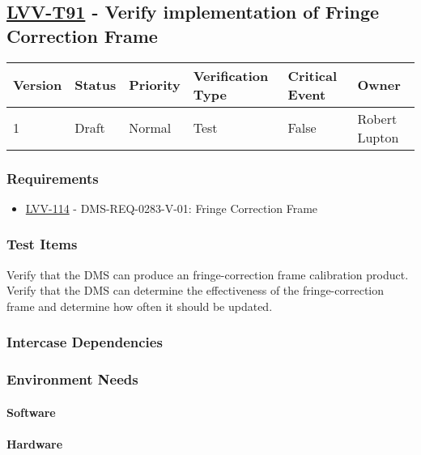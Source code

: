 \subsection{\href{https://jira.lsstcorp.org/secure/Tests.jspa\#/testCase/LVV-T91}{LVV-T91}
    - Verify implementation of Fringe Correction Frame}\label{lvv-t91}

\begin{longtable}[]{llllll}
\toprule
Version & Status & Priority & Verification Type & Critical Event & Owner
\\\midrule
1 & Draft & Normal &
Test & False & Robert Lupton
\\\bottomrule
\end{longtable}

\subsubsection{Requirements}
\begin{itemize}
\item \href{https://jira.lsstcorp.org/browse/LVV-114}{LVV-114} - DMS-REQ-0283-V-01: Fringe Correction Frame
\end{itemize}

\subsubsection{Test Items}
Verify that the DMS can produce an fringe-correction frame calibration
product.\\
Verify that the DMS can determine the effectiveness of the
fringe-correction frame and determine how often it should be updated.



\subsubsection{Intercase Dependencies}

\subsubsection{Environment Needs}

\paragraph{Software}

\paragraph{Hardware}

